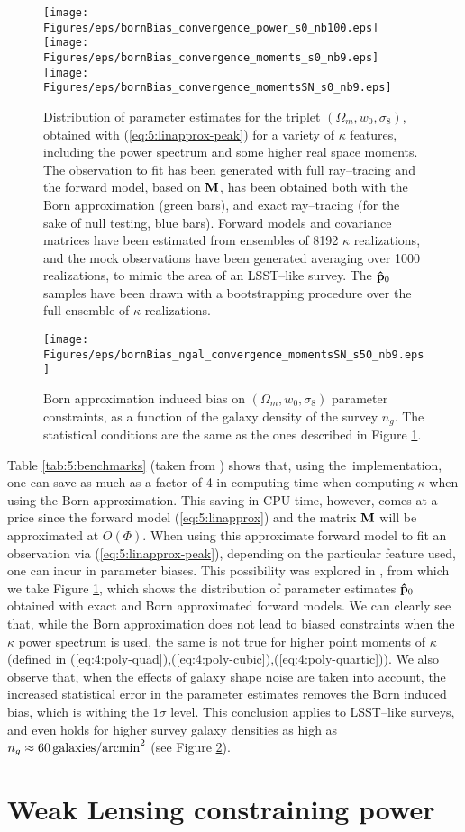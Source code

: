 % 
\begin{figure}
\begin{center}
\texttt{[image: Figures/eps/bornBias\_convergence\_power\_s0\_nb100.eps]}
\texttt{[image: Figures/eps/bornBias\_convergence\_moments\_s0\_nb9.eps]}
\texttt{[image: Figures/eps/bornBias\_convergence\_momentsSN\_s0\_nb9.eps]}
\end{center}
\caption{Distribution of parameter estimates for the triplet $(\Omega_m,w_0,\sigma_8)$, obtained with (\ref{eq:5:linapprox-peak}) for a variety of $\kappa$ features, including the power spectrum and some higher real space moments. The observation to fit has been generated with full ray--tracing and the forward model, based on $\mathbf{M}$, has been obtained both with the Born approximation (green bars), and exact ray--tracing (for the sake of null testing, blue bars). Forward models and covariance matrices have been estimated from ensembles of 8192 $\kappa$ realizations, and the mock observations have been generated averaging over 1000 realizations, to mimic the area of an LSST--like survey. The $\mathbf{\hat{p}}_0$ samples have been drawn with a bootstrapping procedure over the full ensemble of $\kappa$ realizations.}
\label{fig:5:biasfeat}
\end{figure}
%
\begin{figure}
\begin{center}
\texttt{[image: Figures/eps/bornBias\_ngal\_convergence\_momentsSN\_s50\_nb9.eps]}
\end{center}
\caption{Born approximation induced bias on $(\Omega_m,w_0,\sigma_8)$ parameter constraints, as a function of the galaxy density of the survey $n_g$. The statistical conditions are the same as the ones described in Figure \ref{fig:5:biasfeat}.}
\label{fig:5:biasng}
\end{figure}
%
Table \ref{tab:5:benchmarks} (taken from \citep{PetriBorn}) shows that, using the \LT\,implementation, one can save as much as a factor of 4 in computing time when computing $\kappa$ when using the Born approximation. This saving in CPU time, however, comes at a price since the forward model (\ref{eq:5:linapprox}) and the matrix $\mathbf{M}$ will be approximated at $O(\Phi)$. When using this approximate forward model to fit an observation via (\ref{eq:5:linapprox-peak}), depending on the particular feature used, one can incur in parameter biases. This possibility was explored in \citep{PetriBorn}, from which we take Figure \ref{fig:5:biasfeat}, which shows the distribution of parameter estimates $\mathbf{\hat{p}}_0$ obtained with exact and Born approximated forward models. We can clearly see that, while the Born approximation does not lead to biased constraints when the $\kappa$ power spectrum is used, the same is not true for higher point moments of $\kappa$ (defined in (\ref{eq:4:poly-quad}),(\ref{eq:4:poly-cubic}),(\ref{eq:4:poly-quartic})). We also observe that, when the effects of galaxy shape noise are taken into account, the increased statistical error in the parameter estimates removes the Born induced bias, which is withing the $1\sigma$ level. This conclusion applies to LSST--like surveys, and even holds for higher survey galaxy densities as high as $n_g\approx 60\,{\rm galaxies/arcmin}^2$ (see Figure \ref{fig:5:biasng}).  

\section{Weak Lensing constraining power}

%